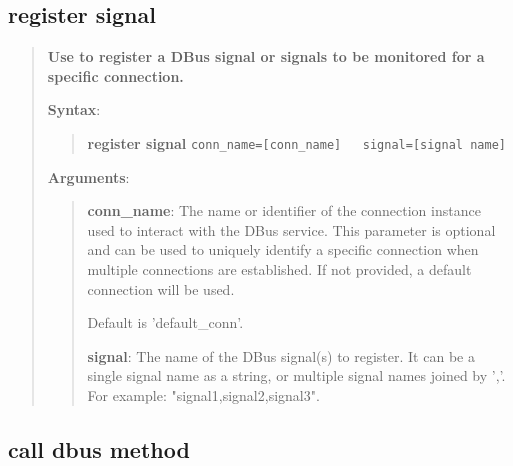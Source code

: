 \hypertarget{description-register-signal}{%
\subsection{\texorpdfstring{\textbf{register signal}}{register signal}}\label{description-register-signal}}
\begin{quote}
\textbf{Use to register a DBus signal or signals to be monitored for a specific connection.}

\textbf{Syntax}:
\begin{quote}
\textbf{register signal}
\texttt{conn\_name={[}conn\_name{]}\ \ \ signal={[}signal name{]}}
\end{quote}

\textbf{Arguments}:

\begin{quote}
\textbf{conn\_name}: The name or identifier of the connection instance used to interact with the DBus service.
  This parameter is optional and can be used to uniquely identify a specific connection
  when multiple connections are established. If not provided, a default connection will be used.
  
  Default is 'default\_conn'.
  
\vspace{\baselineskip}

\textbf{signal}: The name of the DBus signal(s) to register. It can be a single signal name as a string,
  or multiple signal names joined by ','. For example: "signal1,signal2,signal3".
\end{quote}
\end{quote}

\hypertarget{description-call-dbus-method}{%
\subsection{\texorpdfstring{\textbf{call dbus method}}{call dbus method}}\label{description-call-dbus-method}}

